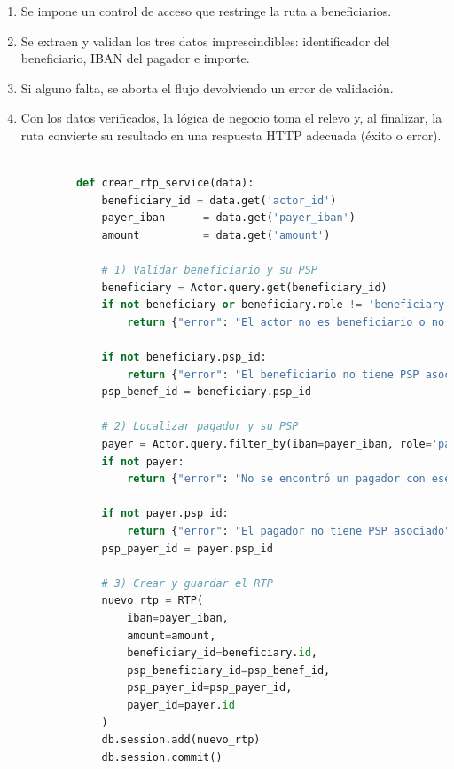 \begin{itemize}
        \begin{enumerate}
           \item Se impone un control de acceso que restringe la ruta a
                 beneficiarios.  
           \item Se extraen y validan los tres datos imprescindibles:
                 identificador del beneficiario, IBAN del pagador e importe.  
           \item Si alguno falta, se aborta el flujo devolviendo un error de
                 validación.  
           \item Con los datos verificados, la lógica de negocio toma el
                 relevo y, al finalizar, la ruta convierte su resultado en una
                 respuesta HTTP adecuada (éxito o error).
        \end{enumerate}
        \vspace{0.8em}

       \begin{lstlisting}[language=Python, style=custom, caption={Servicio de negocio creacion RTP}]

            def crear_rtp_service(data):
                beneficiary_id = data.get('actor_id')
                payer_iban      = data.get('payer_iban')
                amount          = data.get('amount')

                # 1) Validar beneficiario y su PSP
                beneficiary = Actor.query.get(beneficiary_id)
                if not beneficiary or beneficiary.role != 'beneficiary':
                    return {"error": "El actor no es beneficiario o no existe"}

                if not beneficiary.psp_id:
                    return {"error": "El beneficiario no tiene PSP asociado"}
                psp_benef_id = beneficiary.psp_id

                # 2) Localizar pagador y su PSP
                payer = Actor.query.filter_by(iban=payer_iban, role='payer').first()
                if not payer:
                    return {"error": "No se encontró un pagador con ese IBAN"}

                if not payer.psp_id:
                    return {"error": "El pagador no tiene PSP asociado"}
                psp_payer_id = payer.psp_id

                # 3) Crear y guardar el RTP
                nuevo_rtp = RTP(
                    iban=payer_iban,
                    amount=amount,
                    beneficiary_id=beneficiary.id,
                    psp_beneficiary_id=psp_benef_id,
                    psp_payer_id=psp_payer_id,
                    payer_id=payer.id
                )
                db.session.add(nuevo_rtp)
                db.session.commit()


\end{lstlisting}
\end{itemize}
